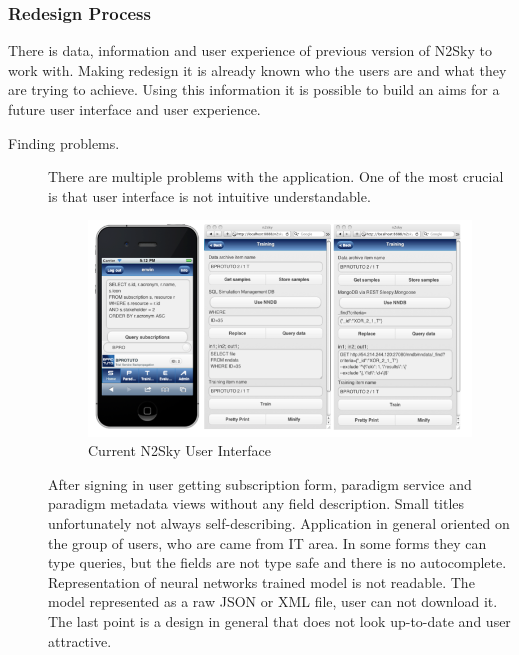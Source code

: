 \subsubsection{Redesign Process }\label{Redesign Process}

There is data, information and user experience of previous version of N2Sky to work with. Making redesign it is already known who the users are and what they are trying to achieve.  Using this information it is possible to build an aims for a future user interface and user experience.


\begin{description}

\item[Finding problems.]  There are multiple problems with the application. One of the most crucial is that user interface is not intuitive understandable. 
\begin{figure}[htbp]
\begin{center}
  \includegraphics[width=\linewidth]{components/2/old_arch.png}
  \caption{Current N2Sky User Interface}
  \label{fig:old_arch}
\end{center}
\end{figure}


After signing in user getting subscription form, paradigm service and paradigm metadata views without any field description. Small titles unfortunately not always self-describing. Application in general oriented on the group of users, who are came from IT area. In some forms they can type queries, but the fields are not type safe and there is no autocomplete.
Representation of neural networks trained model is not readable. The model represented as a raw JSON or XML file, user can not download it. The last point is a design in general that does not look up-to-date and user attractive. 



\end{description}
